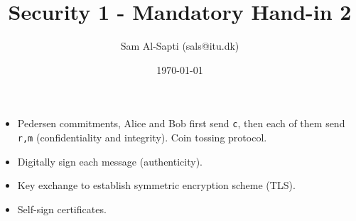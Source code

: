 \documentclass[12pt,a4paper]{article}
\title{Security 1 - Mandatory Hand-in 2}
\date{\today}
\author{Sam Al-Sapti (sals@itu.dk)}
\begin{document}
    \maketitle

    \begin{itemize}
        \item Pedersen commitments, Alice and Bob first send \texttt{c}, then
        each of them send \texttt{r,m} (confidentiality and integrity). Coin
        tossing protocol.
        \item Digitally sign each message (authenticity).
        \item Key exchange to establish symmetric encryption scheme (TLS).
        \item Self-sign certificates.
    \end{itemize}
\end{document}

